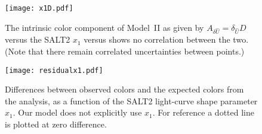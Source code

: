 \documentclass{aastex61}   	%
\begin{document}
\begin{figure}[htbp] %
   \centering
   \texttt{[image: x1D.pdf]}
    \caption{The
    intrinsic color component of Model~II as given by
    $A_{\delta {\hat{U}}}  = \delta_{\hat{U}} D$
    versus
    the SALT2 $x_1$ versus
    shows no correlation between the two.  (Note that there remain correlated uncertainties between points.)
   \label{x1:fig}}
\end{figure}


\begin{figure}[htbp] %
   \centering
   \texttt{[image: residualx1.pdf]}
    \caption{Differences between observed colors and the     \color{red}
    expected \color{black} colors
     from the analysis, as a function
            of the SALT2 light-curve shape parameter $x_1$.  Our model does not explicitly use $x_1$.  For reference a dotted line is plotted at zero difference.
   \label{x1res:fig}}
\end{figure}
\end{document}
